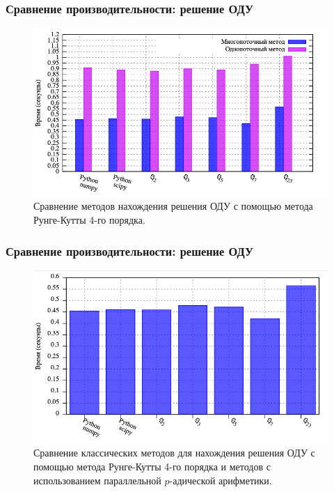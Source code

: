 \documentclass[10pt,professionalfont,utf8,presentation,compress]{beamer}
\theoremstyle{definition}
\theoremstyle{plain}
\begin{document}
\begin{frame}
\frametitle{Сравнение производительности: решение ОДУ}
\begin{figure}[H]
\centerline{\includegraphics[width=0.95\linewidth]{../gnuplot/multi/rk/plot.png}}
\caption{Сравнение методов нахождения решения ОДУ с помощью метода Рунге-Кутты 4-го порядка.}
\label{img:comp:ode:rk}
\end{figure}
\end{frame}


\begin{frame}
\frametitle{Сравнение производительности: решение ОДУ}
\begin{figure}[H]
\centerline{\includegraphics[width=0.95\linewidth]{../gnuplot/multi/rk/multi.png}}
\caption{Сравнение классических методов для нахождения решения ОДУ с помощью метода Рунге-Кутты 4-го порядка и методов с использованием параллельной $p$-адической арифметики.}
\label{img:comp:ode:rk:multi}
\end{figure}
\end{frame}
\end{document}
